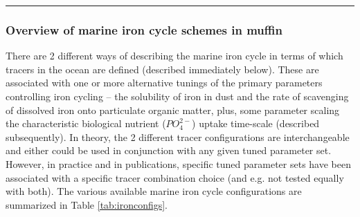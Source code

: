 \documentclass[11pt,fleqn]{book} %
\begin{document}
%
\noindent\rule{4cm}{0.5pt}
\subsubsection{Overview of  marine iron cycle schemes in muffin}
\vspace{1mm}

There are 2 different ways of describing the marine iron cycle in terms of which tracers in the ocean are defined (described immediately below). These are associated with one or more alternative tunings of the primary parameters controlling iron cycling -- the solubility of iron in dust and the rate of scavenging of dissolved iron onto particulate organic matter, plus, some parameter scaling the characteristic biological nutrient (\(PO^{2-}_{4}\)) uptake time-scale (described subsequently). In theory, the 2 different tracer configurations are interchangeable and either could be used in conjunction with any given tuned parameter set. However, in practice and in publications, specific tuned parameter sets have been associated with a specific tracer combination choice (and e.g. not tested equally with both). The various available marine iron cycle configurations are summarized in Table \ref{tab:ironconfigs}.
\end{document}
